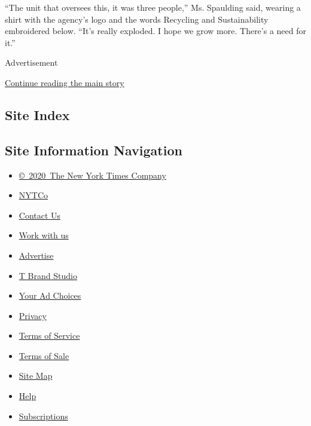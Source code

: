 ``The unit that oversees this, it was three people,'' Ms. Spaulding
said, wearing a shirt with the agency's logo and the words Recycling and
Sustainability embroidered below. ``It's really exploded. I hope we grow
more. There's a need for it.''

Advertisement

\protect\hyperlink{after-bottom}{Continue reading the main story}

\hypertarget{site-index}{%
\subsection{Site Index}\label{site-index}}

\hypertarget{site-information-navigation}{%
\subsection{Site Information
Navigation}\label{site-information-navigation}}

\begin{itemize}
\tightlist
\item
  \href{https://help.nytimes3xbfgragh.onion/hc/en-us/articles/115014792127-Copyright-notice}{©~2020~The
  New York Times Company}
\end{itemize}

\begin{itemize}
\tightlist
\item
  \href{https://www.nytco.com/}{NYTCo}
\item
  \href{https://help.nytimes3xbfgragh.onion/hc/en-us/articles/115015385887-Contact-Us}{Contact
  Us}
\item
  \href{https://www.nytco.com/careers/}{Work with us}
\item
  \href{https://nytmediakit.com/}{Advertise}
\item
  \href{http://www.tbrandstudio.com/}{T Brand Studio}
\item
  \href{https://www.nytimes3xbfgragh.onion/privacy/cookie-policy\#how-do-i-manage-trackers}{Your
  Ad Choices}
\item
  \href{https://www.nytimes3xbfgragh.onion/privacy}{Privacy}
\item
  \href{https://help.nytimes3xbfgragh.onion/hc/en-us/articles/115014893428-Terms-of-service}{Terms
  of Service}
\item
  \href{https://help.nytimes3xbfgragh.onion/hc/en-us/articles/115014893968-Terms-of-sale}{Terms
  of Sale}
\item
  \href{https://spiderbites.nytimes3xbfgragh.onion}{Site Map}
\item
  \href{https://help.nytimes3xbfgragh.onion/hc/en-us}{Help}
\item
  \href{https://www.nytimes3xbfgragh.onion/subscription?campaignId=37WXW}{Subscriptions}
\end{itemize}
